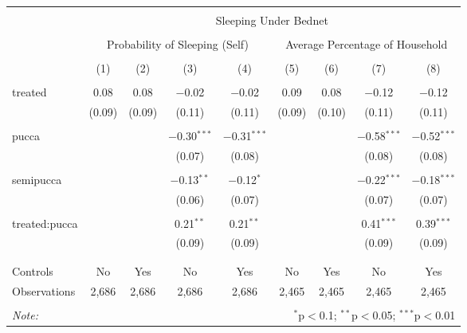 
\begin{table}[!htbp] \centering 
  \caption{} 
  \label{} 
\small 
\begin{tabular}{@{\extracolsep{5pt}}lcccccccc} 
\\[-1.8ex]\hline 
\hline \\[-1.8ex] 
 & \multicolumn{8}{c}{Sleeping Under Bednet} \\ 
\cline{2-9} 
\\[-1.8ex] & \multicolumn{4}{c}{Probability of Sleeping (Self)} & \multicolumn{4}{c}{Average Percentage of Household} \\ 
\\[-1.8ex] & (1) & (2) & (3) & (4) & (5) & (6) & (7) & (8)\\ 
\hline \\[-1.8ex] 
 treated & 0.08 & 0.08 & $-$0.02 & $-$0.02 & 0.09 & 0.08 & $-$0.12 & $-$0.12 \\ 
  & (0.09) & (0.09) & (0.11) & (0.11) & (0.09) & (0.10) & (0.11) & (0.11) \\ 
  & & & & & & & & \\ 
 pucca &  &  & $-$0.30$^{***}$ & $-$0.31$^{***}$ &  &  & $-$0.58$^{***}$ & $-$0.52$^{***}$ \\ 
  &  &  & (0.07) & (0.08) &  &  & (0.08) & (0.08) \\ 
  & & & & & & & & \\ 
 semipucca &  &  & $-$0.13$^{**}$ & $-$0.12$^{*}$ &  &  & $-$0.22$^{***}$ & $-$0.18$^{***}$ \\ 
  &  &  & (0.06) & (0.07) &  &  & (0.07) & (0.07) \\ 
  & & & & & & & & \\ 
 treated:pucca &  &  & 0.21$^{**}$ & 0.21$^{**}$ &  &  & 0.41$^{***}$ & 0.39$^{***}$ \\ 
  &  &  & (0.09) & (0.09) &  &  & (0.09) & (0.09) \\ 
  & & & & & & & & \\ 
\hline \\[-1.8ex] 
Controls & No & Yes & No & Yes & No & Yes & No & Yes \\ 
Observations & 2,686 & 2,686 & 2,686 & 2,686 & 2,465 & 2,465 & 2,465 & 2,465 \\ 
\hline 
\hline \\[-1.8ex] 
\textit{Note:}  & \multicolumn{8}{r}{$^{*}$p$<$0.1; $^{**}$p$<$0.05; $^{***}$p$<$0.01} \\ 
\end{tabular} 
\end{table} 
